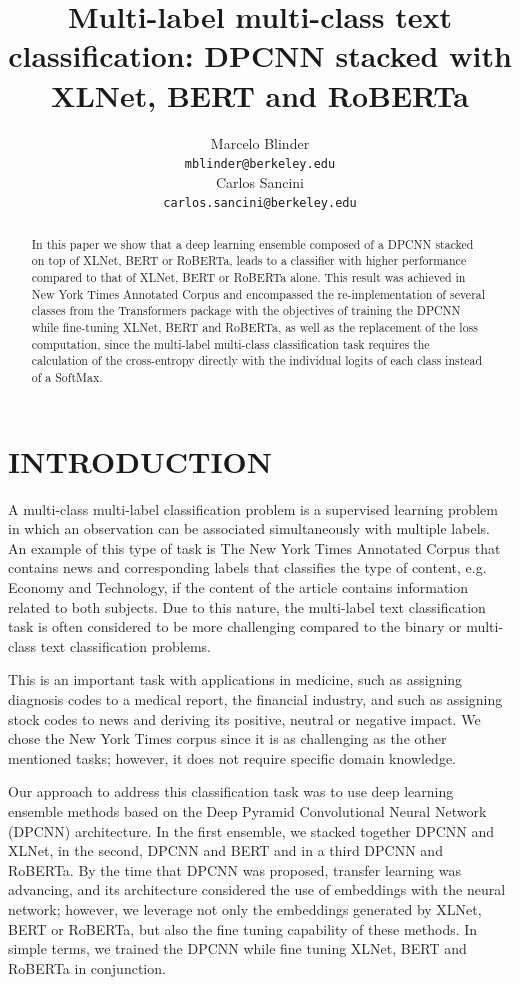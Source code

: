 \documentclass{article}
\title{Multi-label multi-class text classification: DPCNN stacked with XLNet, BERT and RoBERTa}
\author{
  Marcelo Blinder \\
  \texttt{mblinder@berkeley.edu} \\
   \And
 Carlos Sancini \\
  \texttt{carlos.sancini@berkeley.edu} \\
}
\begin{document}
\maketitle

\begin{abstract}
In this paper we show that a deep learning ensemble composed of a DPCNN stacked on top of XLNet, BERT or RoBERTa, leads to a classifier with higher performance compared to that of XLNet, BERT or RoBERTa alone. This result was achieved in New York Times Annotated Corpus and encompassed the re-implementation of several classes from the Transformers package with the objectives of training the DPCNN while fine-tuning XLNet, BERT and RoBERTa, as well as the replacement of the loss computation, since the multi-label multi-class classification task requires the calculation of the cross-entropy directly with the individual logits of each class instead of a SoftMax.
\end{abstract}

\section{INTRODUCTION}

A multi-class multi-label classification problem is a supervised learning problem in which an observation can be associated simultaneously with multiple labels. An example of this type of task is The New York Times Annotated Corpus that contains news and corresponding labels that classifies the type of content, e.g. Economy and Technology, if the content of the article contains information related to both subjects.  Due to this nature, the multi-label text classification task is often considered to be more challenging compared to the binary or multi-class text classification problems.

This is an important task with applications in medicine, such as assigning diagnosis codes to a medical report, the financial industry, and such as assigning stock codes to news and deriving its positive, neutral or negative impact. We chose the New York Times corpus since it is as challenging as the other mentioned tasks; however, it does not require specific domain knowledge.

Our approach to address this classification task was to use deep learning ensemble methods based on the Deep Pyramid Convolutional Neural Network (DPCNN)\cite{dpcnn_ref} architecture. In the first ensemble, we stacked together DPCNN and XLNet\cite{xlnet_ref}, in the second, DPCNN and BERT\cite{bert_ref} and in a third DPCNN and RoBERTa\cite{roberta_ref}. By the time that DPCNN was proposed, transfer learning was advancing, and its architecture considered the use of embeddings with the neural network; however, we leverage not only the embeddings generated by XLNet, BERT or RoBERTa, but also the fine tuning capability of these methods. In simple terms, we trained the DPCNN while fine tuning XLNet, BERT and RoBERTa in conjunction. 
\end{document}
